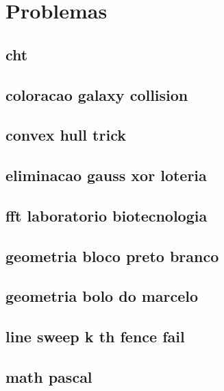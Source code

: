 \section{Problemas}
\subsection{cht}
\raggedbottom
\hrulefill
\subsection{coloracao galaxy collision}
\raggedbottom
\hrulefill
\subsection{convex hull trick}
\raggedbottom
\hrulefill
\subsection{eliminacao gauss xor loteria}
\raggedbottom
\hrulefill
\subsection{fft laboratorio biotecnologia}
\raggedbottom
\hrulefill
\subsection{geometria bloco preto branco}
\raggedbottom
\hrulefill
\subsection{geometria bolo do marcelo}
\raggedbottom
\hrulefill
\subsection{line sweep k th fence fail}
\raggedbottom
\hrulefill
\subsection{math pascal}
\raggedbottom
\hrulefill
